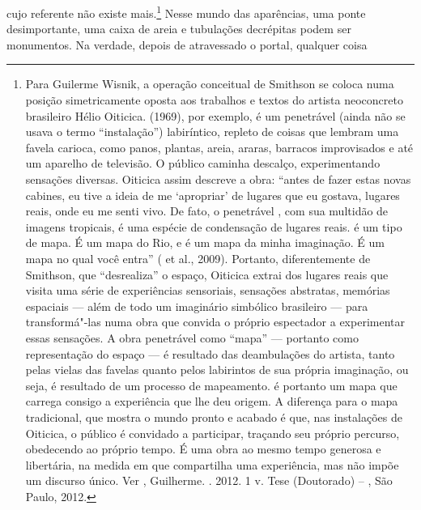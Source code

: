 cujo referente não existe mais.\footnote{Para Guilerme Wisnik, a
  operação conceitual de Smithson se coloca numa posição simetricamente
  oposta aos trabalhos e textos do artista neoconcreto brasileiro Hélio
  Oiticica. {} (1969), por exemplo, é um penetrável
  (ainda não se usava o termo ``instalação'') labiríntico, repleto de
  coisas que lembram uma favela carioca, como panos, plantas, areia,
  araras, barracos improvisados e até um aparelho de televisão. O
  público caminha descalço, experimentando sensações diversas. Oiticica
  assim descreve a obra: ``antes de fazer estas novas cabines, eu tive a
  ideia de me `apropriar' de lugares que eu gostava, lugares reais, onde
  eu me senti vivo. De fato, o penetrável {}, com sua multidão
  de imagens tropicais, é uma espécie de condensação de lugares
  reais. {} é um tipo de mapa. É um mapa do Rio, e é um mapa da
  minha imaginação. É um mapa no qual você entra'' ( et
  al., 2009). Portanto, diferentemente de Smithson, que ``desrealiza'' o
  espaço, Oiticica extrai dos lugares reais que visita uma série de
  experiências sensoriais, sensações abstratas, memórias espaciais ---
  além de todo um imaginário simbólico brasileiro --- para transformá"-las
  numa obra que convida o próprio espectador a experimentar essas
  sensações. A obra penetrável como ``mapa'' --- portanto como
  representação do espaço --- é resultado das deambulações do artista,
  tanto pelas vielas das favelas quanto pelos labirintos de sua própria
  imaginação, ou seja, é resultado de um processo de mapeamento.
  {} é portanto um mapa que carrega consigo a experiência
  que lhe deu origem. A diferença para o mapa tradicional, que mostra o
  mundo pronto e acabado é que, nas instalações de Oiticica, o público é
  convidado a participar, traçando seu próprio percurso, obedecendo ao
  próprio tempo. É uma obra ao mesmo tempo generosa e libertária, na
  medida em que compartilha uma experiência, mas não impõe um discurso
  único. Ver , Guilherme. {}. 2012. 1 v. Tese (Doutorado) --
  , São Paulo, 2012.} Nesse mundo das aparências, uma ponte
desimportante, uma caixa de areia e tubulações decrépitas podem ser
monumentos. Na verdade, depois de atravessado o portal, qualquer coisa
